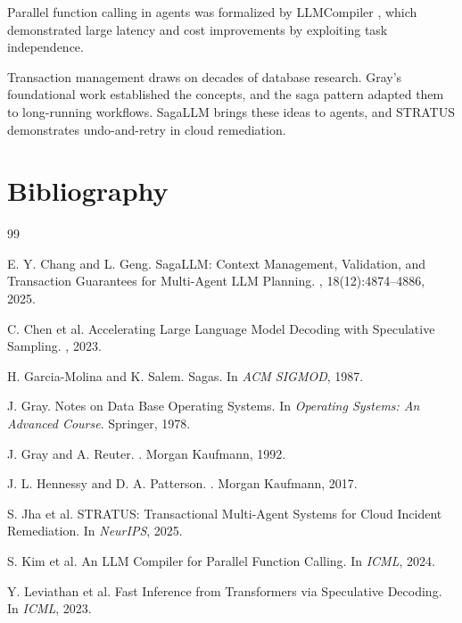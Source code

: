 \documentclass[11pt]{book}
\begin{document}
Parallel function calling in agents was formalized by LLMCompiler \cite{kim2024llmcompiler}, which demonstrated large latency and cost improvements by exploiting task independence.

Transaction management draws on decades of database research. Gray's foundational work \cite{gray1978notes} established the concepts, and the saga pattern \cite{garciamolina1987sagas} adapted them to long-running workflows. SagaLLM \cite{chang2025sagallm} brings these ideas to agents, and STRATUS \cite{jha2025stratus} demonstrates undo-and-retry in cloud remediation.

\section*{Bibliography}

\begin{thebibliography}{99}

E. Y. Chang and L. Geng.
\newblock SagaLLM: Context Management, Validation, and Transaction Guarantees for Multi-Agent LLM Planning.
, 18(12):4874--4886, 2025.

C. Chen et al.
\newblock Accelerating Large Language Model Decoding with Speculative Sampling.
, 2023.

H. Garcia-Molina and K. Salem.
\newblock Sagas.
\newblock In {\em ACM SIGMOD}, 1987.

J. Gray.
\newblock Notes on Data Base Operating Systems.
\newblock In {\em Operating Systems: An Advanced Course}. Springer, 1978.

J. Gray and A. Reuter.
.
\newblock Morgan Kaufmann, 1992.

J. L. Hennessy and D. A. Patterson.
.
\newblock Morgan Kaufmann, 2017.

S. Jha et al.
\newblock STRATUS: Transactional Multi-Agent Systems for Cloud Incident Remediation.
\newblock In {\em NeurIPS}, 2025.

S. Kim et al.
\newblock An LLM Compiler for Parallel Function Calling.
\newblock In {\em ICML}, 2024.

Y. Leviathan et al.
\newblock Fast Inference from Transformers via Speculative Decoding.
\newblock In {\em ICML}, 2023.


\end{thebibliography}
\end{document}
